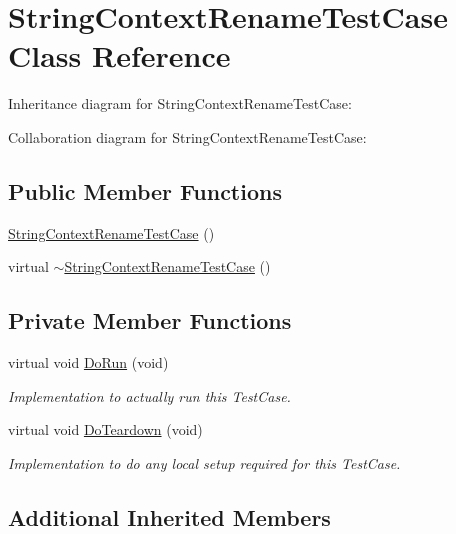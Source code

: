 \hypertarget{classStringContextRenameTestCase}{}\section{String\+Context\+Rename\+Test\+Case Class Reference}
\label{classStringContextRenameTestCase}


Inheritance diagram for String\+Context\+Rename\+Test\+Case\+:


Collaboration diagram for String\+Context\+Rename\+Test\+Case\+:
\subsection*{Public Member Functions}
\begin{DoxyCompactItemize}
\item 
\hyperlink{classStringContextRenameTestCase_a253b2a9598ca81970f8d64c30b96df83}{String\+Context\+Rename\+Test\+Case} ()
\item 
virtual \hyperlink{classStringContextRenameTestCase_af4e1275624bf22f70d05fd946ebeda8d}{$\sim$\+String\+Context\+Rename\+Test\+Case} ()
\end{DoxyCompactItemize}
\subsection*{Private Member Functions}
\begin{DoxyCompactItemize}
\item 
virtual void \hyperlink{classStringContextRenameTestCase_a2415052fc31133dbac56e7c672aa3dd3}{Do\+Run} (void)
\begin{DoxyCompactList}\small\item\em Implementation to actually run this Test\+Case. \end{DoxyCompactList}\item 
virtual void \hyperlink{classStringContextRenameTestCase_aecf7657cd0116651675720259b545e60}{Do\+Teardown} (void)
\begin{DoxyCompactList}\small\item\em Implementation to do any local setup required for this Test\+Case. \end{DoxyCompactList}\end{DoxyCompactItemize}
\subsection*{Additional Inherited Members}


